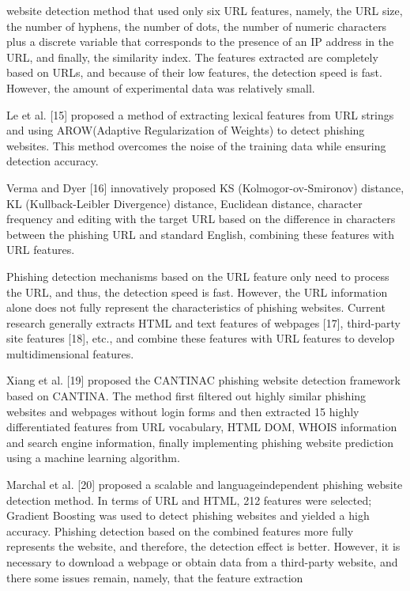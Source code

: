 \documentclass{ieeeaccess}
\begin{document}
website detection method that used only six URL features,
namely, the URL size, the number of hyphens, the number
of dots, the number of numeric characters plus a discrete
variable that corresponds to the presence of an IP address
in the URL, and finally, the similarity index. The features
extracted are completely based on URLs, and because of their
low features, the detection speed is fast. However, the amount
of experimental data was relatively small.\par Le et al. [15] proposed a method of extracting lexical features
from URL strings and using AROW(Adaptive Regularization
of Weights) to detect phishing websites. This method
overcomes the noise of the training data while ensuring detection
accuracy.\par Verma and Dyer [16] innovatively proposed KS
(Kolmogor-ov-Smironov) distance, KL (Kullback-Leibler
Divergence) distance, Euclidean distance, character frequency
and editing with the target URL based on the difference
in characters between the phishing URL and standard
English, combining these features with URL features.\par Phishing detection mechanisms based on the URL feature
only need to process the URL, and thus, the detection speed
is fast. However, the URL information alone does not fully
represent the characteristics of phishing websites. Current
research generally extracts HTML and text features of webpages
[17], third-party site features [18], etc., and combine
these features with URL features to develop multidimensional
features.\par Xiang et al. [19] proposed the CANTINAC phishing website
detection framework based on CANTINA. The method
first filtered out highly similar phishing websites and webpages
without login forms and then extracted 15 highly differentiated
features from URL vocabulary, HTML DOM,
WHOIS information and search engine information, finally
implementing phishing website prediction using a machine
learning algorithm.\par Marchal et al. [20] proposed a scalable and languageindependent
phishing website detection method. In terms
of URL and HTML, 212 features were selected; Gradient
Boosting was used to detect phishing websites and yielded
a high accuracy. Phishing detection based on the combined
features more fully represents the website, and therefore,
the detection effect is better. However, it is necessary to download
a webpage or obtain data from a third-party website, and
there some issues remain, namely, that the feature extraction
\end{document}
